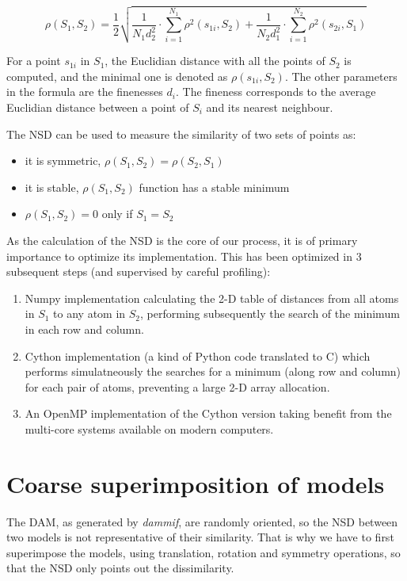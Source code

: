\documentclass[a4paper, 11pt]{report}
\begin{document}
\[
\rho(S_{1},S_{2})= \frac{1}{2} \sqrt {\frac{1}{N_{1}d_{2}^2} 
\cdot \sum\limits_{i=1}^{N_{1}} \rho^2(s_{1i}, S_{2}) + \frac{1}{N_{2}d_{1}^2} \cdot \sum\limits_{i=1}^{N_{2}} \rho^2(s_{2i}, S_{1})}
\]

For a point $s_{1i}$ in $S_{1}$, the Euclidian distance with all the 
points of $S_{2}$ is computed, and the minimal one is denoted as 
$\rho(s_{1i}, S_{2})$. 
The other parameters in the formula are the finenesses $d_{i}$. 
The fineness corresponds to the average Euclidian distance between a 
point of $S_{i}$ and its nearest neighbour.

The NSD can be used to measure the similarity of two sets of points as:
\begin{itemize}
 \item it is symmetric, $\rho(S_{1},S_{2}) = \rho(S_{2},S_{1})$
 \item it is stable, $\rho(S_{1},S_{2})$ function has a stable minimum
 \item $\rho(S_{1},S_{2}) = 0$ only if $S_{1} = S_{2}$
\end{itemize}

As the calculation of the NSD is the core of our process, it is of 
primary importance to optimize its implementation. This has been 
optimized in 3 subsequent steps (and supervised by careful profiling):
\begin{enumerate}
  \item Numpy implementation calculating the 2-D table of distances from all
  atoms in $S_{1}$ to any atom in $S_{2}$, performing subsequently the search 
  of the minimum in each row and column.
  \item Cython implementation \cite{cython} (a kind of Python code translated
  to C) which performs simulatneously the searches for a minimum (along row 
  and column) for each pair of atoms, preventing a large 2-D array allocation.
  \item An OpenMP \cite{openmp} implementation of the Cython version taking
  benefit from the multi-core systems available on modern computers.
\end{enumerate}

\section{Coarse superimposition of models}

The DAM, as generated by \textit{dammif}, are randomly oriented, so the NSD
between two models is not representative of their similarity.
That is why we have to first superimpose the models, using 
translation, rotation and symmetry operations, so that the NSD only 
points out the dissimilarity.\\
\end{document}
